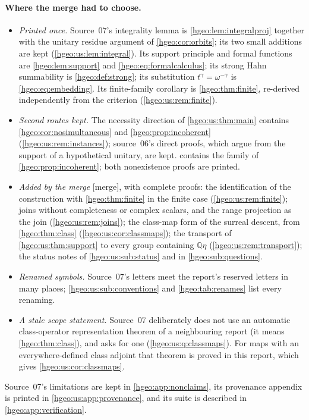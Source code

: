 \documentclass[11pt,letterpaper]{article}
\numberwithin{equation}{section}
\theoremstyle{definition}
\theoremstyle{remark}
\newcommand{\Q}{\mathbb Q}
\newcommand{\mergetag}{\textup{\textsf{\small[merge]}}}
\begin{document}
\paragraph{Where the merge had to choose.}
\begin{itemize}[leftmargin=*]
\item \emph{Printed once.} Source~07's integrality lemma is
\cref{hgeo:lem:integralproj} together with the unitary residue argument of
\cref{hgeo:cor:orbits}; its two small additions are kept
(\cref{hgeo:us:lem:integral}). Its support principle and formal functions
are \cref{hgeo:lem:support} and \eqref{hgeo:eq:formalcalculus}; its strong
Hahn summability is \cref{hgeo:def:strong}; its substitution
$t^\gamma=\omega^{-\gamma}$ is \eqref{hgeo:eq:embedding}. Its finite-family
corollary is \cref{hgeo:thm:finite}, re-derived independently from the
criterion (\cref{hgeo:us:rem:finite}).
\item \emph{Second routes kept.} The necessity direction of
\cref{hgeo:us:thm:main} contains \cref{hgeo:cor:nosimultaneous} and
\cref{hgeo:prop:incoherent} (\cref{hgeo:us:rem:instances}); source~06's
direct proofs, which argue from the support of a hypothetical unitary, are
kept.  contains the family of
\cref{hgeo:prop:incoherent}; both nonexistence proofs are printed.
\item \emph{Added by the merge} \mergetag, with complete proofs: the
identification of the construction with \cref{hgeo:thm:finite} in the finite
case (\cref{hgeo:us:rem:finite}); joins without completeness or complex
scalars, and the range projection as the join (\cref{hgeo:us:rem:joins});
the class-map form of the surreal descent, from \cref{hgeo:thm:class}
(\cref{hgeo:us:cor:classmaps}); the transport of \cref{hgeo:us:thm:support}
to every group containing $\Q\eta$ (\cref{hgeo:us:rem:transport}); the status
notes of \cref{hgeo:us:sub:status} and in \cref{hgeo:sub:questions}.
\item \emph{Renamed symbols.} Source~07's letters meet the report's reserved
letters in many places; \cref{hgeo:us:sub:conventions} and
\cref{hgeo:tab:renames} list every renaming.
\item \emph{A stale scope statement.} Source~07 deliberately does not use an
automatic class-operator representation theorem of a neighbouring report
(it means \cref{hgeo:thm:class}), and asks for one
(\cref{hgeo:us:q:classmaps}). For maps with an everywhere-defined class
adjoint that theorem is proved in this report, which gives
\cref{hgeo:us:cor:classmaps}.
\end{itemize}
Source~07's limitations are kept in \cref{hgeo:app:nonclaims}, its
provenance appendix is printed in \cref{hgeo:us:app:provenance}, and its suite
is described in \cref{hgeo:app:verification}.
\end{document}
